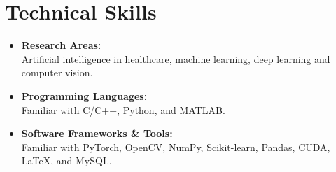 \documentclass[a4,11pt]{article}
\newenvironment{zitemize}{
\begin{itemize}\itemsep0pt \parskip0pt \parsep1pt}
{\end{itemize}\vspace{-0.5cm}}
\begin{document}
\section{\large \textbf{Technical Skills}}
\begin{zitemize}
\item \textbf{Research Areas:} \\ 
			Artificial intelligence in healthcare, \space machine learning, \space deep learning \space and \space computer vision.

\vspace{0.2cm}

\item \textbf{Programming Languages:} \\ 
			Familiar \space with \space C/C++, \space Python, \space and \space MATLAB.

\vspace{0.2cm}

\item \textbf{Software Frameworks \& Tools:}\\
			 Familiar \space with \space PyTorch, \space OpenCV, \space NumPy, \space Scikit-learn, \space Pandas,  \space CUDA, \space LaTeX, \space and \space MySQL.


\end{zitemize}



\end{document}

